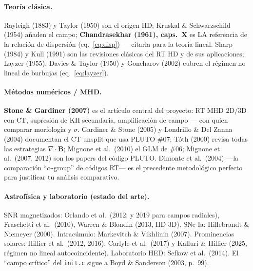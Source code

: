 \documentclass[11pt,a4paper]{article}
\newcommand{\B}{\mathbf{B}}
\newcommand{\code}[1]{\texttt{#1}}
\begin{document}
\paragraph{Teoría clásica.}
Rayleigh (1883) y Taylor (1950) son el origen HD; Kruskal \& Schwarzschild (1954) añaden el
campo; \textbf{Chandrasekhar (1961), caps.~X} es LA referencia de la relación de dispersión
(eq.~\ref{eq:disp}) — citarla para la teoría lineal. Sharp (1984) y Kull (1991) son las
revisiones clásicas del RT HD y de sus aplicaciones; Layzer (1955), Davies \& Taylor (1950) y
Goncharov (2002) cubren el régimen no lineal de burbujas (eq.~\ref{eq:layzer}).

\paragraph{Métodos numéricos / MHD.}
\textbf{Stone \& Gardiner (2007)} es el artículo central del proyecto: RT MHD 2D/3D con CT,
supresión de KH secundaria, amplificación de campo — con quien comparar morfología y
$\sigma$. Gardiner \& Stone (2005) y Londrillo \& Del Zanna (2004) documentan el CT unsplit
que usa PLUTO \#07; Tóth (2000) revisa todas las estrategias $\nabla\cdot\B$; Mignone et al.\
(2010) el GLM de \#06; Mignone et al.\ (2007, 2012) son los papers del código PLUTO.
Dimonte et al.\ (2004) —la comparación ``$\alpha$-group'' de códigos RT— es el precedente
metodológico perfecto para justificar tu análisis comparativo.

\paragraph{Astrofísica y laboratorio (estado del arte).}
SNR magnetizados: Orlando et al.\ (2012; y 2019 para campos radiales), Fraschetti et al.\
(2010), Warren \& Blondin (2013, HD 3D). SNe Ia: Hillebrandt \& Niemeyer (2000).
Intracúmulo: Markevitch \& Vikhlinin (2007). Prominencias solares: Hillier et al.\
(2012, 2016), Carlyle et al.\ (2017) y Kalluri \& Hillier (2025, régimen no lineal
autocoincidente). Laboratorio HED: Sefkow et al.\ (2014). El ``campo crítico'' del
\code{init.c} sigue a Boyd \& Sanderson (2003, p.~99).
\end{document}
